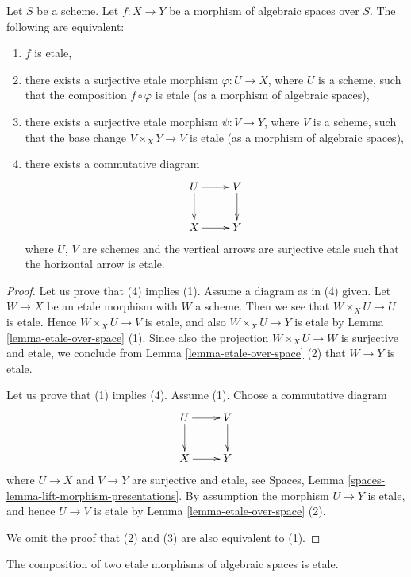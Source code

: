 \begin{lemma}
\label{lemma-etale-local}
Let $S$ be a scheme.
Let $f : X \to Y$ be a morphism of algebraic spaces over $S$.
The following are equivalent:
\begin{enumerate}
\item $f$ is etale,
\item there exists a surjective etale morphism $\varphi : U \to X$,
where $U$ is a scheme, such that the composition $f \circ \varphi$ is
etale (as a morphism of algebraic spaces),
\item there exists a surjective etale morphism $\psi : V \to Y$,
where $V$ is a scheme, such that the base change $V \times_X Y \to V$
is etale (as a morphism of algebraic spaces),
\item there exists a commutative diagram
$$
\xymatrix{
U \ar[d] \ar[r] & V \ar[d] \\
X \ar[r] & Y
}
$$
where $U$, $V$ are schemes and the vertical arrows are surjective etale
such that the horizontal arrow is etale.
\end{enumerate}
\end{lemma}

\begin{proof}
Let us prove that (4) implies (1). Assume a diagram as in (4) given.
Let $W \to X$ be an etale morphism with $W$ a scheme. Then we see
that $W \times_X U \to U$ is etale. Hence $W \times_X U \to V$ is etale,
and also $W \times_X U \to Y$ is etale by
Lemma \ref{lemma-etale-over-space} (1). Since also
the projection $W \times_X U \to W$ is surjective and etale, we conclude
from Lemma \ref{lemma-etale-over-space} (2) that $W \to Y$ is etale.

\medskip\noindent
Let us prove that (1) implies (4). Assume (1). Choose a commutative diagram
$$
\xymatrix{
U \ar[d] \ar[r] & V \ar[d] \\
X \ar[r] & Y
}
$$
where $U \to X$ and $V \to Y$ are surjective and etale, see
Spaces, Lemma \ref{spaces-lemma-lift-morphism-presentations}.
By assumption the morphism $U \to Y$ is etale,
and hence $U \to V$ is etale by Lemma \ref{lemma-etale-over-space} (2).

\medskip\noindent
We omit the proof that (2) and (3) are also equivalent to (1).
\end{proof}

\begin{lemma}
\label{lemma-composition-etale}
The composition of two etale morphisms of algebraic spaces
is etale.
\end{lemma}

